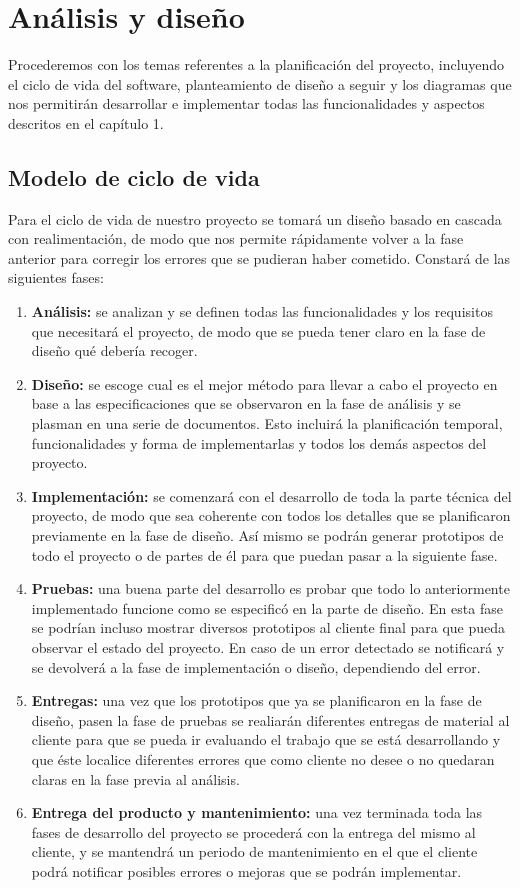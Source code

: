 \documentclass[palatino]{apuntes}
\begin{document}
\chapter{Análisis y diseño}
Procederemos con los temas referentes a la planificación del proyecto, incluyendo el ciclo de vida del software, planteamiento de diseño a seguir y los diagramas que nos permitirán desarrollar e implementar todas las funcionalidades y aspectos descritos en el capítulo 1.

\section{Modelo de ciclo de vida}

Para el ciclo de vida de nuestro proyecto se tomará un diseño basado en cascada con realimentación, de modo que nos permite rápidamente volver a la fase anterior para corregir los errores que se pudieran haber cometido. Constará de las siguientes fases:

\begin{enumerate}
	\item \textbf{Análisis:} se analizan y se definen todas las funcionalidades y los requisitos que necesitará el proyecto, de modo que se pueda tener claro en la fase de diseño qué debería recoger.
	\item \textbf{Diseño:} se escoge cual es el mejor método para llevar a cabo el proyecto en base a las especificaciones que se observaron en la fase de análisis y se plasman en una serie de documentos. Esto incluirá  la planificación temporal, funcionalidades y forma de implementarlas y todos los demás aspectos del proyecto.
	\item \textbf{Implementación:} se comenzará con el desarrollo de toda la parte técnica del proyecto, de modo que sea coherente con todos los detalles que se planificaron previamente en la fase de diseño. Así mismo se podrán generar prototipos de todo el proyecto o de partes de él para que puedan pasar a la siguiente fase.
	\item \textbf{Pruebas:} una buena parte del desarrollo es probar que todo lo anteriormente implementado funcione como se especificó en la parte de diseño. En esta fase se podrían incluso mostrar diversos prototipos al cliente final para que pueda observar el estado del proyecto. En caso de un error detectado se notificará y se devolverá a la fase de implementación o diseño, dependiendo del error.
	\item \textbf{Entregas:} una vez que los prototipos que ya se planificaron en la fase de diseño, pasen la fase de pruebas se realiarán diferentes entregas de material al cliente para que se pueda ir evaluando el trabajo que se está desarrollando y que éste localice diferentes errores que como cliente no desee o no quedaran claras en la fase previa al análisis.
	\item \textbf{Entrega del producto y mantenimiento:} una vez terminada toda las fases de desarrollo del proyecto se procederá con la entrega del mismo al cliente, y se mantendrá un periodo de mantenimiento en el que el cliente podrá notificar posibles errores o mejoras que se podrán implementar.
\end{enumerate}
\end{document}
